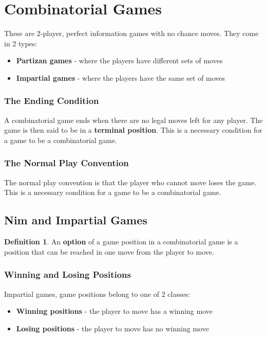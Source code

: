 \documentclass[11pt]{article}
\theoremstyle{plain}
\theoremstyle{definition}
\newtheorem{definition}[theorem]{Definition}
\theoremstyle{remark}
\begin{document}
\section{Combinatorial Games}

These are 2-player, perfect information games with no chance moves. They come in 2 types:
\begin{itemize}
    \item \textbf{Partizan games} - where the players have different sets of moves
    \item \textbf{Impartial games} - where the players have the same set of moves
\end{itemize}

\subsubsection{The Ending Condition}
A combinatorial game ends when there are no legal moves left for any player. The game is then said to be in a \textbf{terminal position}. This is a necessary condition for a game to be a combinatorial game.

\subsubsection{The Normal Play Convention}
The normal play convention is that the player who cannot move loses the game. This is a necessary condition for a game to be a combinatorial game.

\subsection{Nim and Impartial Games}

\setcounter{theorem}{41} 
\begin{definition}
    An \textbf{option} of a game position in a combinatorial game is a position that can be reached in one move from the player to move.
\end{definition}

\subsubsection{Winning and Losing Positions}

Impartial games, game positions belong to one of 2 classes:
\begin{itemize}
    \item \textbf{Winning positions} - the player to move has a winning move
    \item \textbf{Losing positions} - the player to move has no winning move
\end{itemize}
\end{document}
